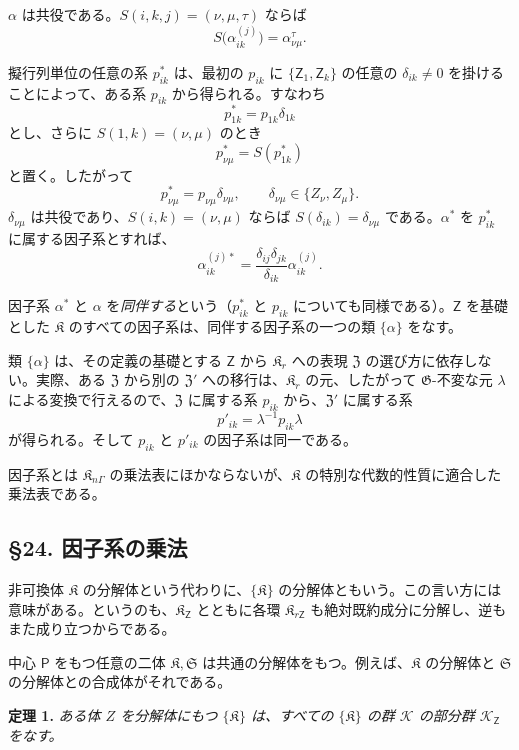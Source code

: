 \(\alpha\) は共役である。\(S(i,k,j)=(\nu,\mu,\tau)\) ならば
\[
S\bigl(\alpha_{ik}^{(j)}\bigr)=\alpha_{\nu\mu}^{\tau}.
\]

擬行列単位の任意の系 \(p_{ik}^*\) は、最初の \(p_{ik}\) に \(\{\mathsf{Z}_1,\mathsf{Z}_k\}\) の任意の \(\delta_{ik}\ne0\) を掛けることによって、ある系 \(p_{ik}\) から得られる。すなわち
\[
p_{1k}^*=p_{1k}\delta_{1k}
\]
とし、さらに \(S(1,k)=(\nu,\mu)\) のとき
\[
p_{\nu\mu}^*=S(p_{1k}^*)
\]
と置く。したがって
\[
p_{\nu\mu}^*=p_{\nu\mu}\delta_{\nu\mu},
\qquad \delta_{\nu\mu}\in\{Z_\nu,Z_\mu\}.
\]
\(\delta_{\nu\mu}\) は共役であり、\(S(i,k)=(\nu,\mu)\) ならば \(S(\delta_{ik})=\delta_{\nu\mu}\) である。\(\alpha^*\) を \(p_{ik}^*\) に属する因子系とすれば、
\[
\alpha_{ik}^{(j)*}=\frac{\delta_{ij}\delta_{jk}}{\delta_{ik}}\alpha_{ik}^{(j)}.
\]

因子系 \(\alpha^*\) と \(\alpha\) を\emph{同伴する}という（\(p_{ik}^*\) と \(p_{ik}\) についても同様である）。\(\mathsf{Z}\) を基礎とした \(\mathfrak K\) のすべての因子系は、同伴する因子系の一つの類 \(\{\alpha\}\) をなす。

類 \(\{\alpha\}\) は、その定義の基礎とする \(\mathsf{Z}\) から \(\mathfrak K_r\) への表現 \(\mathfrak Z\) の選び方に依存しない。実際、ある \(\mathfrak Z\) から別の \(\mathfrak Z'\) への移行は、\(\mathfrak K_r\) の元、したがって \(\mathfrak G\)-不変な元 \(\lambda\) による変換で行えるので、\(\mathfrak Z\) に属する系 \(p_{ik}\) から、\(\mathfrak Z'\) に属する系
\[
p'_{ik}=\lambda^{-1}p_{ik}\lambda
\]
が得られる。そして \(p_{ik}\) と \(p'_{ik}\) の因子系は同一である。

因子系とは \(\mathfrak K_{n\Gamma}\) の乗法表にほかならないが、\(\mathfrak K\) の特別な代数的性質に適合した乗法表である。

\subsection*{\S 24. 因子系の乗法}\label{multiplikation-von-faktorensystemen}

非可換体 \(\mathfrak K\) の分解体という代わりに、\(\{\mathfrak K\}\) の分解体ともいう。この言い方には意味がある。というのも、\(\mathfrak K_{\mathsf{Z}}\) とともに各環 \(\mathfrak K_{r\mathsf{Z}}\) も絶対既約成分に分解し、逆もまた成り立つからである。

中心 \(\mathsf P\) をもつ任意の二体 \(\mathfrak K,\mathfrak S\) は共通の分解体をもつ。例えば、\(\mathfrak K\) の分解体と \(\mathfrak S\) の分解体との合成体がそれである。

\textbf{定理 1.} \emph{ある体 \(Z\) を分解体にもつ \(\{\mathfrak K\}\) は、すべての \(\{\mathfrak K\}\) の群 \(\mathscr K\) の部分群 \(\mathscr K_{\mathsf{Z}}\) をなす。}

